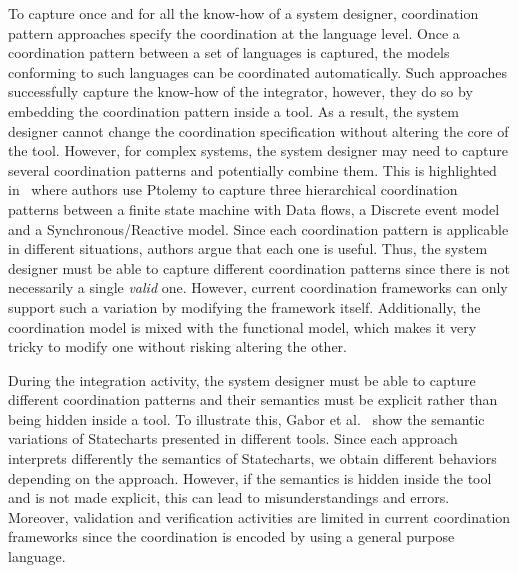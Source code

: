 To capture once and for all the know-how of a system designer, coordination pattern approaches specify the coordination at the language level. Once a coordination pattern between a set of languages is captured, the models conforming to such languages can be coordinated automatically. Such approaches successfully capture the know-how of the integrator, however, they do so by embedding the coordination pattern inside a tool. As a result, the system designer cannot change the coordination specification without altering the core of the tool. However, for complex systems, the system designer may need to capture several coordination patterns and potentially combine them. This is highlighted in~\cite{giraultcompo} where authors use Ptolemy to capture three hierarchical coordination patterns between a finite state machine with Data flows, a Discrete event model and a Synchronous/Reactive model. Since each coordination pattern is applicable in different situations, authors argue that each one is useful. Thus, the system designer must be able to capture different coordination patterns since there is not necessarily a single \emph{valid} one. However, current coordination frameworks can only support such a variation by modifying the framework itself. Additionally, the coordination model is mixed with the functional model, which makes it very tricky to modify one without risking altering the other.
	
During the integration activity, the system designer must be able to capture different coordination patterns and their semantics must be explicit rather than being hidden inside a tool. To illustrate this, Gabor et al.~\cite{gaborpolyglot} show the semantic variations of Statecharts presented in different tools. Since each approach interprets differently the semantics of Statecharts, we obtain different behaviors depending on the approach. However, if the semantics is hidden inside the tool and is not made explicit, this can lead to misunderstandings and errors. Moreover, validation and verification activities are limited in current coordination frameworks since the coordination is encoded by using a general purpose language.
	